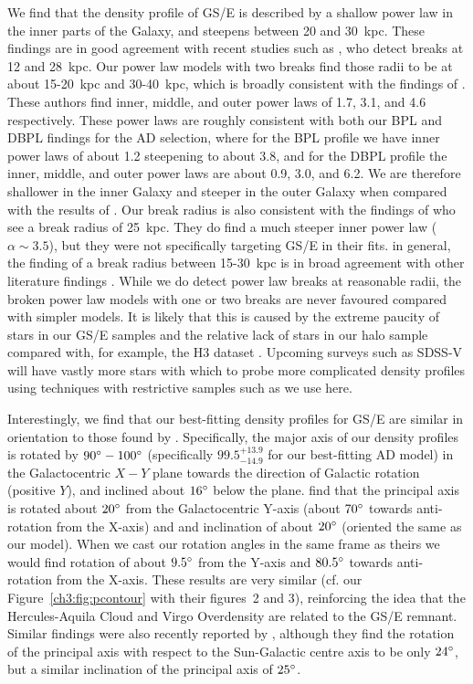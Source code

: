 We find that the density profile of GS/E is described by a shallow power law in the inner parts of the Galaxy, and steepens between 20 and 30~kpc. These findings are in good agreement with recent studies such as \textcite{han22}, who detect breaks at 12 and 28~kpc. Our power law models with two breaks find those radii to be at about 15-20~kpc and 30-40~kpc, which is broadly consistent with the findings of \textcite{han22}. These authors find inner, middle, and outer power laws of 1.7, 3.1, and 4.6 respectively. These power laws are roughly consistent with both our BPL and DBPL findings for the AD selection, where for the BPL profile we have inner power laws of about 1.2 steepening to about 3.8, and for the DBPL profile the inner, middle, and outer power laws are about 0.9, 3.0, and 6.2. We are therefore shallower in the inner Galaxy and steeper in the outer Galaxy when compared with the results of \textcite{han22}. Our break radius is also consistent with the findings of \cite{mackereth20} who see a break radius of 25~kpc. They do find a much steeper inner power law ($\alpha \sim 3.5$), but they were not specifically targeting GS/E in their fits. in general, the finding of a break radius between 15-30~kpc is in broad agreement with other literature findings \parencite{sesar11,deason11,xue15,deason19}. While we do detect power law breaks at reasonable radii, the broken power law models with one or two breaks are never favoured compared with simpler models. It is likely that this is caused by the extreme paucity of stars in our GS/E samples and the relative lack of stars in our halo sample compared with, for example, the H3 dataset \parencite{h3}. Upcoming surveys such as SDSS-V \parencite{sdss5} will have vastly more stars with which to probe more complicated density profiles using techniques with restrictive samples such as we use here.

Interestingly, we find that our best-fitting density profiles for GS/E are similar in orientation to those found by \textcite{iorio19}. Specifically, the major axis of our density profiles is rotated by $90\hbox{$^\circ$}-100\hbox{$^\circ$}$ (specifically $99.5^{+13.9}_{-14.9}$ for our best-fitting AD model) in the Galactocentric $X-Y$ plane towards the direction of Galactic rotation (positive $Y$), and inclined about $16\hbox{$^\circ$}$ below the plane. \textcite{iorio19} find that the principal axis is rotated about $20\hbox{$^\circ$}$ from the Galactocentric Y-axis (about $70\hbox{$^\circ$}$ towards anti-rotation from the X-axis) and and inclination of about $20\hbox{$^\circ$}$ (oriented the same as our model). When we cast our rotation angles in the same frame as theirs we would find rotation of about $9.5\hbox{$^\circ$}$ from the Y-axis and $80.5\hbox{$^\circ$}$ towards anti-rotation from the X-axis. These results are very similar (cf. our Figure~\ref{ch3:fig:pcontour} with their figures~2 and 3), reinforcing the idea that the Hercules-Aquila Cloud and Virgo Overdensity are related to the GS/E remnant. Similar findings were also recently reported by \textcite{han22}, although they find the rotation of the principal axis with respect to the Sun-Galactic centre axis to be only $24\hbox{$^\circ$}$, but a similar inclination of the principal axis of $25\hbox{$^\circ$}$.

